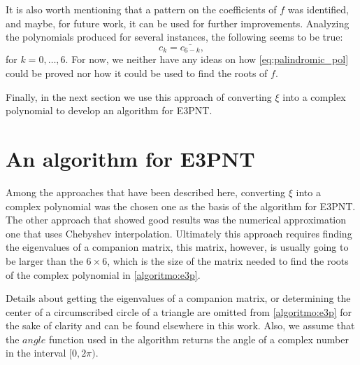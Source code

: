 It is also worth mentioning that a pattern on the coefficients of $f$ was identified, and maybe, for future work, it can be used for further improvements. Analyzing the polynomials produced for several instances, the following seems to be true:
\begin{equation}\label{eq:palindromic_pol}
c_k = \overline{c_{6-k}},
\end{equation}
for $k=0, \dots, 6$. For now, we neither have any ideas on how \autoref{eq:palindromic_pol} could be proved nor how it could be used to find the roots of $f$.

Finally, in the next section we use this approach of converting $\xi$ into a complex polynomial to develop an algorithm for E3PNT.

\section{An algorithm for E3PNT}

Among the approaches that have been described here, converting $\xi$ into a complex polynomial was the chosen one as the basis of the algorithm for E3PNT.
The other approach that showed good results was the numerical approximation one that uses Chebyshev interpolation. Ultimately this approach requires finding the eigenvalues of a companion matrix, this matrix, however, is usually going to be larger than the $6\times 6$, which is the size of the matrix needed to find the roots of the complex polynomial in \autoref{algoritmo:e3p}. 

Details about getting the eigenvalues of a companion matrix, or determining the center of a circumscribed circle of a triangle are omitted from \autoref{algoritmo:e3p} for the sake of clarity and can be found elsewhere in this work. Also, we assume that the $angle$ function used in the algorithm returns the angle of a complex number in the interval $[0, 2\pi)$.


